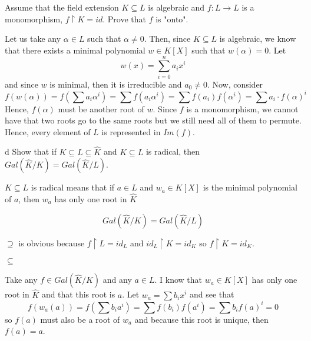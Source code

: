 \documentclass{article}
\begin{document}

\begin{problem}[4]{}
Assume that the field extension $K\subseteq L$ is algebraic and $f:L\to L$ is a monomorphism, $f\restriction K=id$. Prove that $f$ is "onto".
\end{problem}

Let us take any $\alpha\in L$ such that $\alpha\neq 0$. Then, since $K\subseteq L$ is algebraic, we know that there exists a minimal polynomial $w\in K[X]$ such that $w(\alpha)=0$. Let
$$w(x)=\sum\limits_{i=0}^na_ix^i$$
and since $w$ is minimal, then it is irreducible and $a_0\neq 0$. Now, consider
$$f(w(\alpha))=f(\sum a_i\alpha^i)=\sum f(a_i\alpha^i)=\sum f(a_i)f(\alpha^i)=\sum a_i\cdot f(\alpha)^i$$
Hence, $f(\alpha)$ must be another root of $w$. Since $f$ is a monomorphism, we cannot have that two roots go to the same roots but we still need all of them to permute. Hence, every element of $L$ is represented in $Im(f)$.

\begin{problem}[5]{d}
Show that if $K\subseteq L\subseteq\hat{K}$ and $K\subseteq L$ is radical, then $Gal(\hat{K}/K)=Gal(\hat{K}/L)$.
\end{problem}

$K\subseteq L$ is radical means that if $a\in L$ and $w_a\in K[X]$ is the minimal polynomial of $a$, then $w_a$ has only one root in $\hat{K}$

$$Gal(\hat{K}/K)=Gal(\hat{K}/L)$$

$\supseteq$ is obvious because $f\restriction L=id_L$ and $id_L\restriction K=id_K$ so $f\restriction K=id_K$.

$\subseteq$

Take any $f\in Gal(\hat{K}/K)$ and any $a\in L$. I know that $w_a\in K[X]$ has only one root in $\hat{K}$ and that this root is $a$. Let $w_a=\sum b_ix^i$ and see that
$$f(w_a(a))=f(\sum b_ia^i)=\sum f(b_i)f(a^i)=\sum b_if(a)^i=0$$
so $f(a)$ must also be a root of $w_a$ and because this root is unique, then $f(a)=a$.


\end{document}
